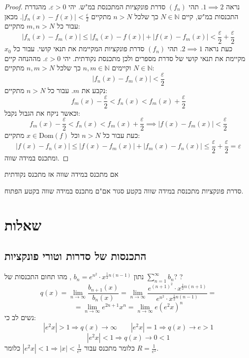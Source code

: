 \documentclass{tstextbook}
\begin{document}
\begin{proof}
נראה \(1\implies 2\). תהי \((f_{n})\) סדרת פונקציות המתכנסת במ"ש. יהי \(\varepsilon>0\). מהגדרת התכנסות במ"ש, קיים \(N \in \mathbb{N}\) כך שלכל \(n > N\) מתקיים \(\lvert f_{n}(x)-f(x) \rvert<\frac{\varepsilon}{2}\). מכאן עבור כל \(m,n>N\) מתקיים:
$$\lvert f_{n}(x)-f_{m}(x) \rvert \leq \lvert f_{n}(x)-f(x) \rvert +\lvert f(x)-f_{m}(x) \rvert <\frac{\varepsilon}{2}+\frac{\varepsilon}{2}$$
כעת נראה \(2\implies 1\). תהי \((f_{n})\) סדרת פונקציות המקיימת את תנאי קושי.  עבור כל \(x_{0}\) מקיימת את תנאי קושי של סדרת מספרים ולכן מתכנסת נקודתית. יהי \(\varepsilon>0\). מההנחה קיים \(N \in \mathbb{N}\) וקיימים \(n,m \in \mathbb{N}\) כך שלכל \(n,m> N\) מתקיים:
$$\lvert f_{n}(x)-f_{m}(x) \rvert <\frac{\varepsilon}{2}$$
נקבע את \(m\). עבור כל \(n>N\) מתקיים:
$$f_{m}(x)-\frac{\varepsilon}{2}<f_{n}(x)<f_{m}(x)+\frac{\varepsilon}{2}$$
וכאשר ניקח את הגבול נקבל:
$$f_{m}(x)-\frac{\varepsilon}{2}<f_{n}(x)<f_{m}(x)+\frac{\varepsilon}{2}\implies \lvert f(x)-f_{m}(x) \rvert <\frac{\varepsilon}{2}$$
כעת עבור כל \(n>N\) וכל \(x \in \mathrm{Dom}(f)\) מתקיים:
$$\lvert f(x)-f_{n}(x) \rvert \leq \lvert f(x)-f_{m}(x) \rvert +\lvert f_{m}(x)-f_{n}(x) \rvert \leq \frac{\varepsilon}{2}+\frac{\varepsilon}{2}=\varepsilon$$
ומתכנס במידה שווה.

\end{proof}
\begin{proposition}
אם מתכנס במידה שווה אז מתכנס נקודתית

\end{proposition}
\begin{proposition}
סדרת פונקציות מתכנסת במידה שווה בקטע סגור אם"ם מתכנס במידה שווה בקטע הפתוח.

\end{proposition}
\chapter{שאלות}

\section{התכנסות של סדרות וטורי פונקציות}

נתון \(b_n = e^{n^2}\cdot x^{\frac{1}{2}n(n-1)}\) , מהו תחום התכנסות של \(\sum_{n=1}^\infty b_n\)?
?
$$q(x) = \lim_{n\to \infty} \frac{b_{n+1}(x)}{b_n(x)} = \lim_{n\to \infty} \frac{e^{(n+1)^2}\cdot x^{\frac{1}{2}n(n+1)}}{e^{n^2}\cdot x^{\frac{1}{2}n(n-1)}}=$$$$=\lim_{n\rightarrow \infty} e^{2n+1} x^n = \lim_{n\to\infty} e(e^2 x)^n$$נשים לב כי:
$$|e^2 x|>1\Rightarrow q(x)\to\infty\qquad |e^2 x|=1\Rightarrow q(x)\to e>1$$$$ |e^2 x|<1\Rightarrow q(x)\to 0<1$$
 כלומר מתכנס עבור \(|e^2 x|<1\Rightarrow |x|<\frac{1}{e^2}\) כלומר \(R=\frac{1}{e^2}\).
\end{document}
